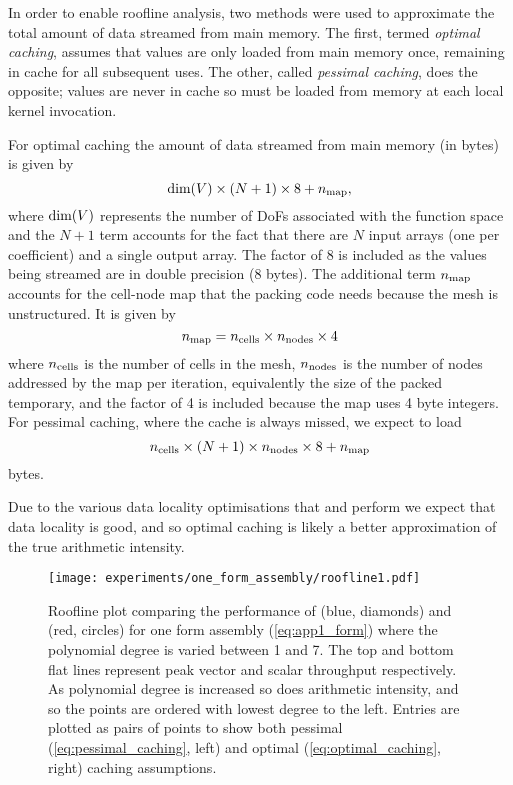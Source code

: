 \documentclass[thesis]{subfiles}
\begin{document}
In order to enable roofline analysis, two methods were used to approximate the total amount of data streamed from main memory.
The first, termed \emph{optimal caching}, assumes that values are only loaded from main memory once, remaining in cache for all subsequent uses.
The other, called \emph{pessimal caching}, does the opposite; values are never in cache so must be loaded from memory at each local kernel invocation.

For optimal caching the amount of data streamed from main memory (in bytes) is given by
\begin{equation}
  \label{eq:optimal_caching}
  \textnormal{dim}(V) \times (N + 1) \times 8 + n_{\textnormal{map}},
\end{equation}
where $\textnormal{dim}(V)$ represents the number of DoFs associated with the function space and the $N+1$ term accounts for the fact that there are $N$ input arrays (one per coefficient) and a single output array.
The factor of 8 is included as the values being streamed are in double precision (8 bytes).
The additional term $n_{\textnormal{map}}$ accounts for the cell-node map that the packing code needs because the mesh is unstructured.
It is given by
\begin{equation}
  n_{\textnormal{map}} = n_{\textnormal{cells}} \times n_{\textnormal{nodes}} \times 4
\end{equation}
where $n_{\textnormal{cells}}$ is the number of cells in the mesh, $n_{\textnormal{nodes}}$ is the number of nodes addressed by the map per iteration, equivalently the size of the packed temporary, and the factor of 4 is included because the map uses 4 byte integers.
For pessimal caching, where the cache is always missed, we expect to load
\begin{equation}
  \label{eq:pessimal_caching}
  n_{\textnormal{cells}} \times (N + 1) \times n_{\textnormal{nodes}} \times 8 + n_{\textnormal{map}}
\end{equation}
bytes.

Due to the various data locality optimisations that  and  perform we expect that data locality is good, and so optimal caching is likely a better approximation of the true arithmetic intensity.

\begin{figure}
  \centering
  \texttt{[image: experiments/one\_form\_assembly/roofline1.pdf]}
  \caption{
    Roofline plot comparing the performance of  (blue, diamonds) and  (red, circles) for one form assembly (\cref{eq:app1_form}) where the polynomial degree is varied between 1 and 7.
    The top and bottom flat lines represent peak vector and scalar throughput respectively.
    As polynomial degree is increased so does arithmetic intensity, and so the points are ordered with lowest degree to the left.
    Entries are plotted as pairs of points to show both pessimal (\cref{eq:pessimal_caching}, left) and optimal (\cref{eq:optimal_caching}, right) caching assumptions.
  }
  \label{fig:app1_roofline1}
\end{figure}
\end{document}
